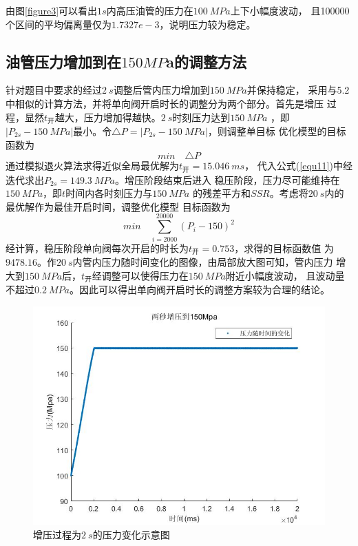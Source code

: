 \documentclass[withoutpreface,bwprint]{cumcmthesis} %
\begin{document}
    由图\ref{figure3}可以看出$1s$内高压油管的压力在$100~MPa$上下小幅度波动，
    且100000个区间的平均偏离量仅为$1.7327e-3$，说明压力较为稳定。

\subsection{油管压力增加到在$150MP$a的调整方法}
    针对题目中要求的经过$2~s$调整后管内压力增加到$150~MPa$并保持稳定，
    采用与5.2中相似的计算方法，并将单向阀开启时长的调整分为两个部分。首先是增压
    过程，显然$t_{\text{开}}$越大，压力增加得越快。$2~s$时刻压力达到$150~MPa$
    ，即$|P_{2s}-150~MPa|$最小。令$\triangle P=|P_{2s}-150~MPa|$，则调整单目标
    优化模型的目标函数为
    \begin{equation}
        min \quad \triangle P
     \label{equ14}
     \end{equation}
    通过模拟退火算法求得近似全局最优解为$t_{\text{开}}=15.046~ms$，
    代入公式(\ref{equ11})中经迭代求出$P_{2s}=149.3~MPa$。增压阶段结束后进入
    稳压阶段，压力尽可能维持在$150~MPa$，即$t$时间内各时刻压力与$150~MPa$
    的残差平方和$SSR$。考虑将$20~s$内的最优解作为最佳开启时间，调整优化模型
    目标函数为
    \begin{equation}
        min \quad \sum\limits_{i=2000}^{20000} (P_i-150)^2
    \label{equ14}
    \end{equation}
    经计算，稳压阶段单向阀每次开启的时长为$t_{\text{开}}=0.753$，求得的目标函数值
    为$9478.16$。作$20~s$内管内压力随时间变化的图像，由局部放大图可知，管内压力
    增大到$150~MPa$后，$t_{\text{开}}$经调整可以使得压力在$150~MPa$附近小幅度波动，
    且波动量不超过$0.2~MPa$。因此可以得出单向阀开启时长的调整方案较为合理的结论。
    \begin{figure}[!h]
    \centering
    \includegraphics[width=.8\textwidth]{2s.jpg}
    \caption{增压过程为$2~s$的压力变化示意图}
    \label{figure4}
    \end{figure}
\end{document}
